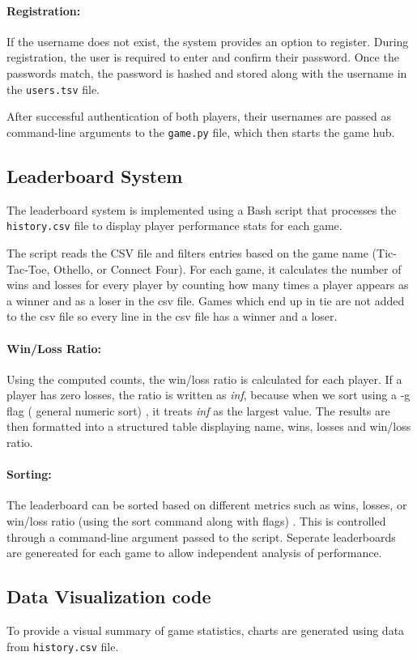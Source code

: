 \documentclass[12pt,a4paper]{article}
\begin{document}
\paragraph{Registration:}
If the username does not exist, the system provides an option to register. During registration, the user is required to enter and confirm their password. Once the passwords match, the password is hashed and stored along with the username in the \texttt{users.tsv} file.

After successful authentication of both players, their usernames are passed as command-line arguments to the \texttt{game.py} file, which then starts the game hub.
\subsection{Leaderboard System}
The leaderboard system is implemented using a Bash script that processes the \texttt{history.csv} file to display player performance stats for each game.

The script reads the CSV file and filters entries based on the game name (Tic-Tac-Toe, Othello, or Connect Four). For each game, it calculates the number of wins and losses for every player by counting how many times a player appears as a winner and as a loser in the csv file. Games which end up in tie are not added to the csv file so every line in the csv file has a winner and a loser.
\paragraph{Win/Loss Ratio:}
Using the computed counts, the win/loss ratio is calculated for each player. If a player has zero losses, the ratio is written as \textit{inf}, because when we sort using a -g flag ( general numeric sort) , it treats \textit{inf} as the largest value. The results are then formatted into a structured table displaying name, wins, losses and win/loss ratio.
\paragraph{Sorting:}
The leaderboard can be sorted based on different metrics such as wins, losses, or win/loss ratio (using the sort command along with flags) . This is controlled through a command-line argument passed to the script. Seperate leaderboards are genereated for each game to allow independent analysis of performance.
\subsection{Data Visualization code}
To provide a visual summary of game statistics, charts are generated using data from \texttt{history.csv} file.
\end{document}
